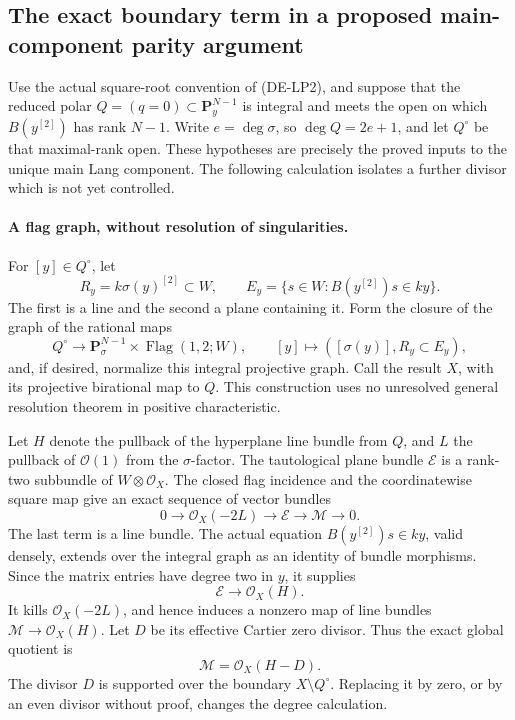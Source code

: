\subsection*{The exact boundary term in a proposed main-component parity argument}

Use the actual square-root convention of (DE-LP2), and suppose that
the reduced polar \(Q=(q=0)\subset\mathbf P^{N-1}_y\) is integral
and meets the open on which \(B(y^{[2]})\) has rank \(N-1\).
Write \(e=\deg\sigma\), so \(\deg Q=2e+1\), and let \(Q^\circ\)
be that maximal-rank open.  These hypotheses are precisely the
proved inputs to the unique main Lang component.  The following
calculation isolates a further divisor which is not yet controlled.

\paragraph{A flag graph, without resolution of singularities.}
For \([y]\in Q^\circ\), let
\[
 R_y=k\sigma(y)^{[2]}\subset W,\qquad
 E_y=\{s\in W:B(y^{[2]})s\in ky\}.
\]
The first is a line and the second a plane containing it.  Form the
closure of the graph of the rational maps
\[
 Q^\circ\longrightarrow
 \mathbf P^{N-1}_{\sigma}\times\operatorname{Flag}(1,2;W),
 \qquad [y]\longmapsto([\sigma(y)],R_y\subset E_y),
\]
and, if desired, normalize this integral projective graph.  Call
the result \(X\), with its projective birational map to \(Q\).
This construction uses no unresolved general resolution theorem
in positive characteristic.

Let \(H\) denote the pullback of the hyperplane line bundle from
\(Q\), and \(L\) the pullback of \(\mathcal O(1)\) from the
\(\sigma\)-factor.  The tautological plane bundle \(\mathcal E\)
is a rank-two subbundle of \(W\otimes\mathcal O_X\).
The closed flag incidence and the coordinatewise square map give
an exact sequence of vector bundles
\[
 0\longrightarrow\mathcal O_X(-2L)
 \longrightarrow\mathcal E
 \longrightarrow\mathcal M\longrightarrow0.                    \tag{MP1}
\]
The last term is a line bundle.  The actual equation
\(B(y^{[2]})s\in ky\), valid densely, extends over the integral
graph as an identity of bundle morphisms.  Since the matrix entries
have degree two in \(y\), it supplies
\[
       \mathcal E\longrightarrow\mathcal O_X(H).
\]
It kills \(\mathcal O_X(-2L)\), and hence induces a nonzero map of
line bundles \(\mathcal M\to\mathcal O_X(H)\).  Let \(D\) be its
effective Cartier zero divisor.  Thus the exact global quotient is
\[
                    \mathcal M=\mathcal O_X(H-D).               \tag{MP2}
\]
The divisor \(D\) is supported over the boundary \(X\setminus
Q^\circ\).  Replacing it by zero, or by an even divisor without
proof, changes the degree calculation.

